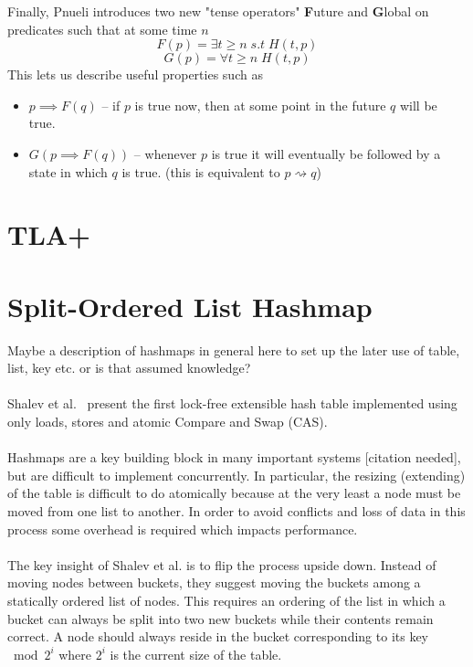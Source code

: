 \documentclass{uit-thesis}
\newcommand{\eventually}{\rightsquigarrow}
\begin{document}
Finally, Pnueli introduces two new "tense operators" \textbf{F}uture and \textbf{G}lobal on predicates such that at some time $n$
$$F(p) = \exists t \geq n \; s.t\; H(t,p)$$
$$G(p) = \forall t \geq n \; H(t,p)$$
This lets us describe useful properties such as
\begin{itemize}[label={}]
    \item $p \implies F(q)$ -- if $p$ is true now, then at some point in the future $q$ will be true.
    \item $G(p \implies F(q))$ -- whenever $p$ is true it will eventually be followed by a state in which $q$ is true. (this is equivalent to $p \eventually q$)     
\end{itemize}
\section{TLA+}\label{sec:TLA+}
\section{Split-Ordered List Hashmap}\label{sec:hashmap}

Maybe a description of hashmaps in general here to set up the later use of table, list, key etc. or is that assumed knowledge?
\\\\
Shalev et al.~\cite{Shalev2006} present the first lock-free extensible hash table implemented using only loads, stores and atomic Compare and Swap (CAS).
\\\\
Hashmaps are a key building block in many important systems [citation needed], but are difficult to implement concurrently. In particular, the resizing (extending) of the table is difficult to do atomically because at the very least a node must be moved from one list to another. In order to avoid conflicts and loss of data in this process some overhead is required which impacts performance.
\\\\
The key insight of Shalev et al. is to flip the process upside down. Instead of moving nodes between buckets, they suggest moving the buckets among a statically ordered list of nodes. This requires an ordering of the list in which a bucket can always be split into two new buckets while their contents remain correct. A node should always reside in the bucket corresponding to its key $\bmod{2^i}$ where $2^i$ is the current size of the table.
\end{document}
